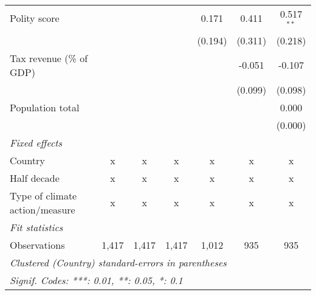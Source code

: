 \begin{tabular}{lcccccc}
   Polity score                                                      &                &                &               & 0.171        & 0.411        & 0.517$^{**}$\\   
                                                                     &                &                &               & (0.194)      & (0.311)      & (0.218)\\   
   Tax revenue (\% of GDP)                                           &                &                &               &              & -0.051       & -0.107\\   
                                                                     &                &                &               &              & (0.099)      & (0.098)\\   
   Population total                                                  &                &                &               &              &              & 0.000\\   
                                                                     &                &                &               &              &              & (0.000)\\   
   \emph{Fixed effects}\\
   Country                                                           & x              & x              & x             & x            & x            & x\\  
   Half decade                                                       & x              & x              & x             & x            & x            & x\\  
   Type of climate action/measure                                    & x              & x              & x             & x            & x            & x\\  
   \midrule \emph{Fit statistics}\\
   Observations                                                      & 1,417          & 1,417          & 1,417         & 1,012        & 935          & 935\\  
   \midrule
   \multicolumn{7}{l}{\emph{Clustered (Country) standard-errors in parentheses}}\\
   \multicolumn{7}{l}{\emph{Signif. Codes: ***: 0.01, **: 0.05, *: 0.1}}\\
\end{tabular}
\par\endgroup


